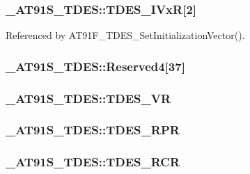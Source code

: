 \hypertarget{struct__AT91S__TDES_ac37cb04675500dc0a5dcec237a5a457}{
\subsubsection{ {\bf \_\-AT91S\_\-TDES::TDES\_\-IVxR}\mbox{[}2\mbox{]}}}
\label{struct__AT91S__TDES_ac37cb04675500dc0a5dcec237a5a457}




Referenced by AT91F\_\-TDES\_\-SetInitializationVector().\hypertarget{struct__AT91S__TDES_19d87315962f28aad8bdb6fe9f987bb0}{
\subsubsection{ {\bf \_\-AT91S\_\-TDES::Reserved4}\mbox{[}37\mbox{]}}}
\label{struct__AT91S__TDES_19d87315962f28aad8bdb6fe9f987bb0}


\hypertarget{struct__AT91S__TDES_1d59f43cdd05883f54b02ecff08683bb}{
\subsubsection{ {\bf \_\-AT91S\_\-TDES::TDES\_\-VR}}}
\label{struct__AT91S__TDES_1d59f43cdd05883f54b02ecff08683bb}


\hypertarget{struct__AT91S__TDES_9a6d62b4c764acb993b2d334319e0451}{
\subsubsection{ {\bf \_\-AT91S\_\-TDES::TDES\_\-RPR}}}
\label{struct__AT91S__TDES_9a6d62b4c764acb993b2d334319e0451}


\hypertarget{struct__AT91S__TDES_fbb23e94d0911285d87f76ce5454b9e8}{
\subsubsection{ {\bf \_\-AT91S\_\-TDES::TDES\_\-RCR}}}
\label{struct__AT91S__TDES_fbb23e94d0911285d87f76ce5454b9e8}


